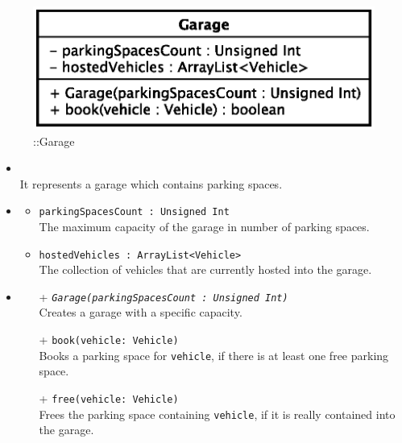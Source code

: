 \begin{figure}[h]
\centering
\includegraphics[scale=0.6,keepaspectratio]{images/solution/app/backend/garage.eps}
\caption{\pReactiveComponentStretchDecoration::Garage}
\label{fig:sd-app-garage}
\end{figure}
\FloatBarrier
\begin{itemize}
  \item \textbf{\descr} \\
    It represents a garage which contains parking spaces.
  \item \textbf{\attrs}
  \begin{itemize}
    \item \texttt{parkingSpacesCount : Unsigned Int} \\
The maximum capacity of the garage in number of parking spaces.
    \item \texttt{hostedVehicles : ArrayList<Vehicle>} \\
The collection of vehicles that are currently hosted into the garage.
  \end{itemize}
  \item \textbf{\ops}
  \begin{itemize}
   \item[+] \texttt{\textit{Garage(parkingSpacesCount : Unsigned Int)}} \\
   Creates a garage with a specific capacity.
   \item[+] \texttt{book(vehicle: Vehicle)} \\
   Books a parking space for \texttt{vehicle},
   if there is at least one free parking space.
   \item[+] \texttt{free(vehicle: Vehicle)} \\
   Frees the parking space containing \texttt{vehicle},
   if it is really contained into the garage.
  \end{itemize}
\end{itemize}
